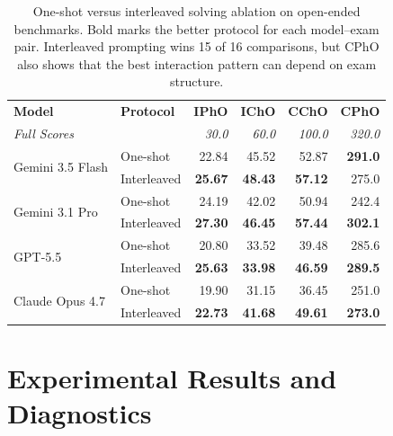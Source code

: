 \documentclass[11pt]{article}
\begin{document}
\begin{table}[t]
\vspace{-0cm}
\centering
\scriptsize
\setlength{\tabcolsep}{5pt}
\renewcommand{\arraystretch}{1.08}
\begin{tabular}{l|l|r r r r}
\toprule
\textbf{Model} & \textbf{Protocol} & \textbf{IPhO} & \textbf{IChO} & \textbf{CChO} & \textbf{CPhO} \\
\multicolumn{2}{l}{\textit{Full Scores}} & \textit{30.0} & \textit{60.0} & \textit{100.0} & \textit{320.0} \\
\midrule
\multirow{2}{*}{Gemini 3.5 Flash}
  & One-shot & 22.84 & 45.52 & 52.87 & \textbf{291.0} \\
  & Interleaved & \textbf{25.67} & \textbf{48.43} & \textbf{57.12} & 275.0 \\
\midrule
\multirow{2}{*}{Gemini 3.1 Pro}
  & One-shot & 24.19 & 42.02 & 50.94 & 242.4 \\
  & Interleaved & \textbf{27.30} & \textbf{46.45} & \textbf{57.44} & \textbf{302.1} \\
\midrule
\multirow{2}{*}{GPT-5.5}
  & One-shot & 20.80 & 33.52 & 39.48 & 285.6 \\
  & Interleaved & \textbf{25.63} & \textbf{33.98} & \textbf{46.59} & \textbf{289.5} \\
\midrule
\multirow{2}{*}{Claude Opus 4.7}
  & One-shot & 19.90 & 31.15 & 36.45 & 251.0 \\
  & Interleaved & \textbf{22.73} & \textbf{41.68} & \textbf{49.61} & \textbf{273.0} \\
\bottomrule
\end{tabular}
\vspace{-0.4em}
\caption{One-shot versus interleaved solving ablation on open-ended benchmarks. Bold marks the better protocol for each model--exam pair. Interleaved prompting wins 15 of 16 comparisons, but CPhO also shows that the best interaction pattern can depend on exam structure.}
\label{tab:oneshot-interleaved-ablation}
\vspace{-0.4cm}
\end{table}




\section{Experimental Results and Diagnostics}
\label{sec:3}
\end{document}
